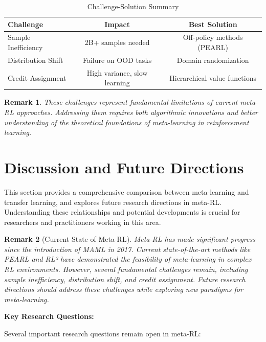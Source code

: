 \documentclass[12pt]{article}
\newcommand{\ieee}[1]{\textcolor{IEEEBlue}{\textbf{#1}}}
\newtheorem{remark}{Remark}
\begin{document}
{{			\begin{table}[H]
			\centering
			\caption{Challenge-Solution Summary}
			\begin{tabular}{@{}lcc@{}}
			\toprule
			\textbf{Challenge} & \textbf{Impact} & \textbf{Best Solution} \\
			\midrule
			Sample Inefficiency & 2B+ samples needed & Off-policy methods (PEARL) \\
			Distribution Shift & Failure on OOD tasks & Domain randomization \\
			Credit Assignment & High variance, slow learning & Hierarchical value functions \\
			\bottomrule
			\end{tabular}
			\label{tab:challenge_solutions}
			\end{table}
			
			\begin{remark}
			These challenges represent fundamental limitations of current meta-RL approaches. Addressing them requires both algorithmic innovations and better understanding of the theoretical foundations of meta-learning in reinforcement learning.
			\end{remark}
			
			\section{Discussion and Future Directions}
			
			This section provides a comprehensive comparison between meta-learning and transfer learning, and explores future research directions in meta-RL. Understanding these relationships and potential developments is crucial for researchers and practitioners working in this area.
			
			\begin{remark}[Current State of Meta-RL]
			Meta-RL has made significant progress since the introduction of MAML in 2017. Current state-of-the-art methods like PEARL and RL² have demonstrated the feasibility of meta-learning in complex RL environments. However, several fundamental challenges remain, including sample inefficiency, distribution shift, and credit assignment. Future research directions should address these challenges while exploring new paradigms for meta-learning.
			\end{remark}
			
			\ieee{Key Research Questions:}
			
			Several important research questions remain open in meta-RL:
			
}}
\end{document}
